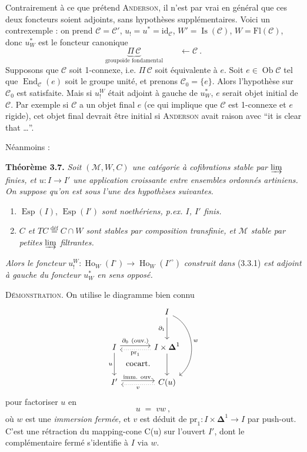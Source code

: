\documentclass[11pt]{article}
\newcommand{\printedpage}[1]{\marginpar{\footnotesize p.~#1}}
\newcommand{\msp}[1]{\marginpar{\footnotesize [#1]}}
\newcommand{\Fl}{\mathrm{Fl}}
\newcommand{\M}{\mathcal{M}}
\newcommand{\Esp}{\operatorname{Esp}}
\newcommand{\Ob}{\operatorname{Ob}}
\newcommand{\Ho}{\operatorname{Ho}}
\newcommand{\id}{\mathrm{id}}
\newcommand{\pr}{\mathrm{pr}}
\begin{document}
\msp{page 59}
Contrairement à ce que prétend \textsc{Anderson}, il n'est par vrai en général que ces deux %
foncteurs soient adjoints, sans hypothèses supplémentaires. Voici un contrexemple : on prend $\mathcal{C} = \mathcal{C}'$, $u_! = u^* = \id_{\mathcal{C}}$, $W' = \operatorname{Is}(\mathcal{C})$, $W = \Fl(\mathcal{C})$, donc $u_W^*$ est le foncteur canonique
\[
\underbrace{\Pi\,\mathcal{C}}_{\text{groupoïde fondamental}} \qquad \longleftarrow \mathcal{C}\ .
\]
Supposons que $\mathcal{C}$ soit 1-connexe, i.e. $\Pi\,\mathcal{C}$ soit équivalente à $e$. Soit $e\in\Ob\mathcal{C}$ tel que $\operatorname{End}_{\mathcal{C}}(e)$ soit le groupe unité, et prenons $\mathcal{C}_0 = \{e\}$. Alors l'hypothèse sur $\mathcal{C}_0$ est satisfaite. Mais si $u_!^W$ était adjoint à gauche de $u_W^*$, $e$ serait objet initial de $\mathcal{C}$. Par exemple si $\mathcal{C}$ a un objet final $e$ (ce qui implique que $\mathcal{C}$ est 1-connexe et $e$ rigide), cet objet final devrait être initial si \textsc{Anderson} avait raison avec “it is clear that \ldots”.

\msp{page 60}
Néanmoins :

\textbf{Théorème 3.7.} \textit{Soit $(\M,W,C)$ une catégorie à cofibrations stable par $\varinjlim$ finies, et $u : I \longrightarrow I'$ une application croissante entre ensembles ordonnés artiniens. On suppose qu'on est sous l'une des hypothèses suivantes.}
\begin{enumerate}
\item[a)] $\Esp(I)$, $\Esp(I')$ \textit{sont noethériens, p.ex. $I$, $I'$ finis.}

\printedpage{30}
\item[b)] \textit{$C$ et $TC \overset{\text{déf}}{=} C\cap W$ sont stables par composition transfinie, et $\M$ stable par petites $\varinjlim$ filtrantes.}
\end{enumerate}
\textit{Alors le foncteur} $u_!^W : \Ho_W(I^\circ) \longrightarrow \Ho_W(I'^\circ)$ \textit{construit dans} (3.3.1) \textit{est adjoint à gauche du foncteur $u_W^*$ en sens opposé.}

\textsc{Démonstration.} On utilise le diagramme bien connu
\[
\begin{tikzcd}[row sep=large, column sep=large]
 & I \arrow[d, "\partial_1"'] \arrow[dd, bend left=60, "w"] \\
I \arrow[r, shift left, "\partial_0\ (\text{ouv.})"] \arrow[d, "u"'] \arrow[dr, phantom, "\text{cocart.}"] & I\times\boldsymbol{\Delta}^1 \arrow[l, dotted, shift left, "\pr_1"] \arrow[d] \\
I' \arrow[r, shift left, "\text{imm. ouv.}"] & C(u) \arrow[l, dotted, shift left, "v"]
\end{tikzcd}
\]
pour factoriser $u$ en
\[
u \;=\; vw\ ,
\]
où $w$ est une \textit{immersion fermée,} et $v$ est déduit de $\pr_1 : I\times\boldsymbol{\Delta}^1 \longrightarrow I$ par push-out. C'est une rétraction du mapping-cone C(u) sur l'ouvert $I'$, dont le complémentaire fermé s'identifie à $I$ via $w$.
\end{document}
